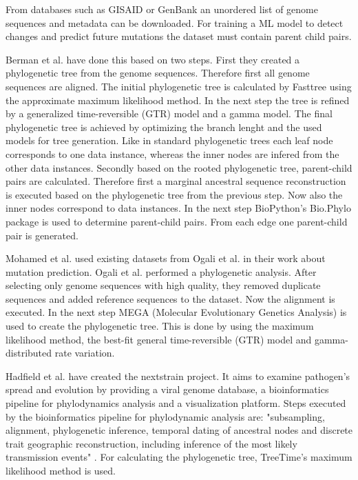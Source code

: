 From databases such as \ac{GISAID} or GenBank an unordered list of genome sequences and metadata can be downloaded. For training a \ac{ML} model to detect changes and predict future mutations the dataset must contain parent child pairs.

Berman et al. \cite{Berman2020} have done this based on two steps. First they created a phylogenetic tree from the genome sequences. Therefore first all genome sequences are aligned. The initial phylogenetic tree is calculated by Fasttree using the approximate maximum likelihood method. In the next step the tree is refined by a generalized time-reversible (GTR) model and a gamma model. The final phylogenetic tree is achieved by optimizing the branch lenght and the used models for tree generation. Like in standard phylogenetic trees each leaf node corresponds to one data instance, whereas the inner nodes are infered from the other data instances.
Secondly based on the rooted phylogenetic tree, parent-child pairs are calculated. Therefore first a marginal ancestral sequence reconstruction is executed based on the phylogenetic tree from the previous step. Now also the inner nodes correspond to data instances. In the next step BioPython's \cite{10.1093/bioinformatics/btp163} Bio.Phylo package is used to determine parent-child pairs. From each edge one parent-child pair is generated. \cite{Berman2020}

Mohamed et al. \cite{Mohamed2021} used existing datasets from Ogali et al. \cite{ogaliMolecularCharacterizationNewcastle2018} in their work about mutation prediction. Ogali et al. \cite{ogaliMolecularCharacterizationNewcastle2018} performed a phylogenetic analysis. After selecting only genome sequences with high quality, they removed duplicate sequences and added reference sequences to the dataset. Now the alignment is executed. In the next step MEGA (Molecular Evolutionary Genetics Analysis) is used to create the phylogenetic tree. This is done by using the maximum likelihood method, the best-fit general time-reversible (GTR) model and gamma-distributed rate variation.

Hadfield et al. \cite{10.1093/bioinformatics/bty407} have created the nextstrain project. It aims to examine pathogen's spread and evolution by providing a viral genome database, a bioinformatics pipeline for phylodynamics analysis and a visualization platform. 
Steps executed by the bioinformatics pipeline for phylodynamic analysis are: "subsampling, alignment, phylogenetic inference, temporal dating of ancestral nodes and discrete trait geographic reconstruction, including inference of the most likely transmission events" \cite{10.1093/bioinformatics/bty407}. For calculating the phylogenetic tree, TreeTime's maximum likelihood method is used. \cite{10.1093/bioinformatics/bty407}



